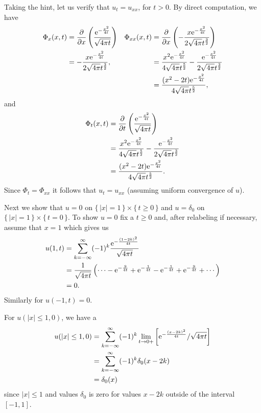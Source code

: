 \begin{solution*}
  Taking the hint, let us verify that \(u_t=u_{xx}\), for \(t>0\). By
  direct computation, we have
  \begin{align*}
    \Phi_x(x,t)
    &=\frac{\partial}{\partial x}
      \left(\frac{\mathrm{e}^{-\frac{x^2}{4t}}}{\sqrt{4\pi t}}\right)
    &\Phi_{xx}(x,t)
    &=\frac{\partial}{\partial x}
      \left(-\frac{x\mathrm{e}^{-\frac{x^2}{4t}}}{2\sqrt{4\pi}t^{\frac{3}{2}}}\right)\\
    &=-\frac{x\mathrm{e}^{-\frac{x^2}{4t}}}{2\sqrt{4\pi}t^{\frac{3}{2}}},
    &&=\frac{x^2\mathrm{e}^{-\frac{x^2}{4t}}}{4\sqrt{4\pi}t^{\frac{5}{2}}}
      -\frac{\mathrm{e}^{-\frac{x^2}{4t}}}{2\sqrt{4\pi}t^{\frac{3}{2}}}
    \\
    &&&=\frac{(x^2-2t)\mathrm{e}^{-\frac{x^2}{4t}}}{4\sqrt{4\pi}t^{\frac{5}{2}}},
  \end{align*}
  and
  \begin{align*}
    \Phi_t(x,t)
    &=\frac{\partial}{\partial t}
      \left(\frac{\mathrm{e}^{-\frac{x^2}{4t}}}{\sqrt{4\pi t}}\right)\\
    &=\frac{x^2\mathrm{e}^{-\frac{x^2}{4t}}}{4\sqrt{4\pi}t^{\frac{5}{2}}}
      -\frac{\mathrm{e}^{-\frac{x^2}{4t}}}{2\sqrt{4\pi}t^{\frac{3}{2}}}\\
    &=\frac{(x^2-2t)\mathrm{e}^{-\frac{x^2}{4t}}}{4\sqrt{4\pi}t^{\frac{5}{2}}}.
  \end{align*}
  Since \(\Phi_t=\Phi_{xx}\) it follows that \(u_t=u_{xx}\) (assuming
  uniform convergence of \(u\)).

  Next we show that \(u=0\) on \(\{\,|x|=1\,\}\times\{\,t\geq 0\,\}\) and
  \(u=\delta_0\) on \(\{\,|x|=1\,\}\times\{\,t=0\,\}\). To show \(u=0\) fix
  a \(t\geq 0\) and, after relabeling if necessary, assume that \(x=1\)
  which gives us
  \begin{align*}
    u(1,t)
    &=\sum_{k=-\infty}^\infty(-1)^k\frac{\rme^{-\frac{(1-2k)^2}{4t}}}{\sqrt{4\pi
      t}}\\
    &=\frac{1}{\sqrt{4\pi t}}%
      \left(\dotsb-\rme^{-\frac{9}{4t}}%
      +\rme^{-\frac{1}{4t}}-\rme^{-\frac{1}{4t}}%
      +\rme^{-\frac{9}{4t}}+\dotsb\right)\\
    &=0.
  \end{align*}
  Similarly for \(u(-1,t)=0\).

  For \(u(|x|\leq 1,0)\), we have a
  \begin{align*}
    u(|x|\leq 1,0)
    &=\sum_{k=-\infty}^\infty(-1)^k\lim_{t\to 0+}
      \left[\mathrm{e}^{-\frac{(x-2k)^2}{4t}}/\sqrt{4\pi t}\right]\\
    &=\sum_{k=-\infty}^\infty(-1)^k\delta_0(x-2k)\\
    &=\delta_0(x)
  \end{align*}
  since \(|x|\leq 1\) and values \(\delta_0\) is zero for values \(x-2k\)
  outside of the interval \([-1,1]\).


\end{solution*}
